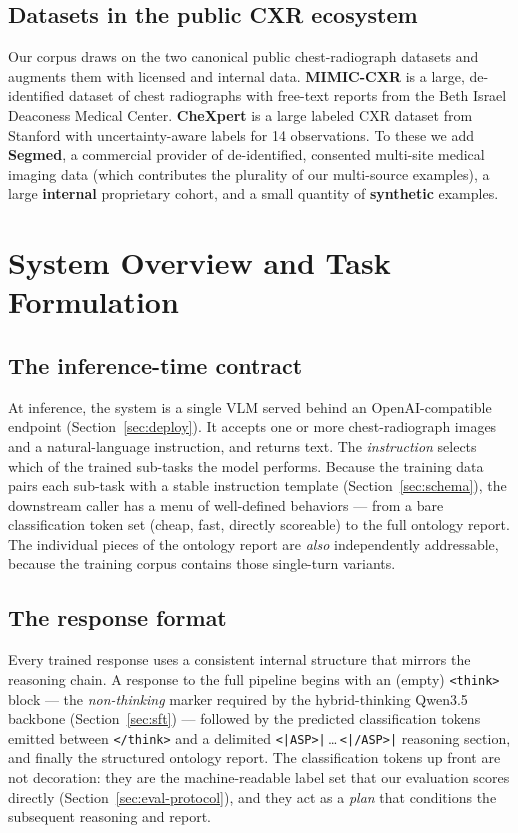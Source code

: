 \documentclass[11pt,a4paper]{article}
\begin{document}
\subsection{Datasets in the public CXR ecosystem}
Our corpus draws on the two canonical public chest-radiograph datasets and augments them with licensed and internal data. \textbf{MIMIC-CXR} is a large, de-identified dataset of chest radiographs with free-text reports from the Beth Israel Deaconess Medical Center. \textbf{CheXpert} is a large labeled CXR dataset from Stanford with uncertainty-aware labels for 14 observations. To these we add \textbf{Segmed}, a commercial provider of de-identified, consented multi-site medical imaging data (which contributes the plurality of our multi-source examples), a large \textbf{internal} proprietary cohort, and a small quantity of \textbf{synthetic} examples.

\section{System Overview and Task Formulation}

\subsection{The inference-time contract}
At inference, the system is a single VLM served behind an OpenAI-compatible endpoint (Section~\ref{sec:deploy}). It accepts one or more chest-radiograph images and a natural-language instruction, and returns text. The \emph{instruction} selects which of the trained sub-tasks the model performs. Because the training data pairs each sub-task with a stable instruction template (Section~\ref{sec:schema}), the downstream caller has a menu of well-defined behaviors --- from a bare classification token set (cheap, fast, directly scoreable) to the full ontology report. The individual pieces of the ontology report are \emph{also} independently addressable, because the training corpus contains those single-turn variants.

\subsection{The response format}
Every trained response uses a consistent internal structure that mirrors the reasoning chain. A response to the full pipeline begins with an (empty) \texttt{<think>} block --- the \emph{non-thinking} marker required by the hybrid-thinking Qwen3.5 backbone (Section~\ref{sec:sft}) --- followed by the predicted classification tokens emitted between \texttt{</think>} and a delimited \texttt{<|ASP>|}\,\dots\,\texttt{<|/ASP>|} reasoning section, and finally the structured ontology report. The classification tokens up front are not decoration: they are the machine-readable label set that our evaluation scores directly (Section~\ref{sec:eval-protocol}), and they act as a \emph{plan} that conditions the subsequent reasoning and report.
\end{document}
